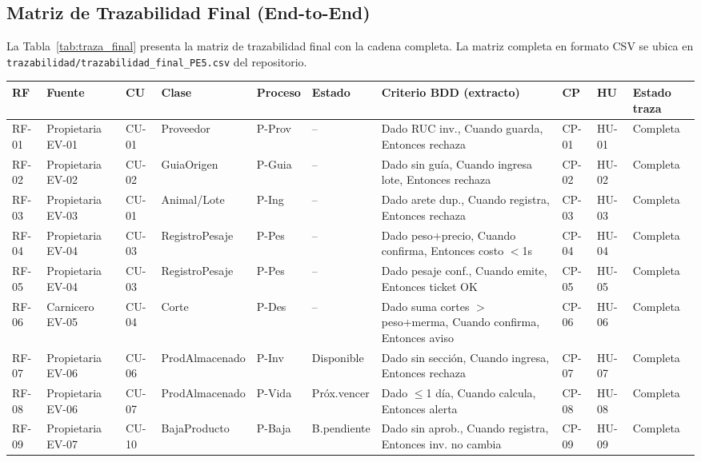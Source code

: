 \documentclass[11pt,a4paper]{article}
\begin{document}
\subsection{Matriz de Trazabilidad Final (End-to-End)}

La Tabla~\ref{tab:traza_final} presenta la matriz de trazabilidad final con la cadena completa. La matriz completa en formato CSV se ubica en \texttt{trazabilidad/trazabilidad\_final\_PE5.csv} del repositorio.

\scriptsize
\begin{longtable}{|p{0.5cm}|p{1.4cm}|p{0.8cm}|p{2cm}|p{1.3cm}|p{1.3cm}|p{2.3cm}|p{0.8cm}|p{1.0cm}|p{1.1cm}|}
\hline
\textbf{RF} & \textbf{Fuente} & \textbf{CU} & \textbf{Clase} & \textbf{Proceso} & \textbf{Estado} & \textbf{Criterio BDD (extracto)} & \textbf{CP} & \textbf{HU} & \textbf{Estado traza} \\
\hline
RF-01 & Propietaria EV-01 & CU-01 & Proveedor & P-Prov & -- & Dado RUC inv., Cuando guarda, Entonces rechaza & CP-01 & HU-01 & Completa \\
RF-02 & Propietaria EV-02 & CU-02 & GuiaOrigen & P-Guia & -- & Dado sin guía, Cuando ingresa lote, Entonces rechaza & CP-02 & HU-02 & Completa \\
RF-03 & Propietaria EV-03 & CU-01 & Animal/Lote & P-Ing & -- & Dado arete dup., Cuando registra, Entonces rechaza & CP-03 & HU-03 & Completa \\
RF-04 & Propietaria EV-04 & CU-03 & RegistroPesaje & P-Pes & -- & Dado peso+precio, Cuando confirma, Entonces costo $<$1s & CP-04 & HU-04 & Completa \\
RF-05 & Propietaria EV-04 & CU-03 & RegistroPesaje & P-Pes & -- & Dado pesaje conf., Cuando emite, Entonces ticket OK & CP-05 & HU-05 & Completa \\
RF-06 & Carnicero EV-05 & CU-04 & Corte & P-Des & -- & Dado suma cortes $>$ peso+merma, Cuando confirma, Entonces aviso & CP-06 & HU-06 & Completa \\
RF-07 & Propietaria EV-06 & CU-06 & ProdAlmacenado & P-Inv & Disponible & Dado sin sección, Cuando ingresa, Entonces rechaza & CP-07 & HU-07 & Completa \\
RF-08 & Propietaria EV-06 & CU-07 & ProdAlmacenado & P-Vida & Próx.vencer & Dado $\leq$1 día, Cuando calcula, Entonces alerta & CP-08 & HU-08 & Completa \\
RF-09 & Propietaria EV-07 & CU-10 & BajaProducto & P-Baja & B.pendiente & Dado sin aprob., Cuando registra, Entonces inv. no cambia & CP-09 & HU-09 & Completa \\

\end{longtable}
\end{document}
